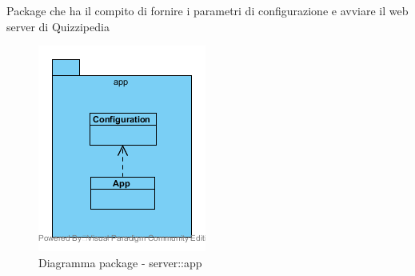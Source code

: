 Package che ha il compito di fornire i parametri di configurazione e avviare il web server di Quizzipedia\begin{center}
	\begin{figure}[H]
		\centering \includegraphics[scale=4, max width=\textwidth, max height=\myheight]{../img/diagrammiClassi/server/app.png}
		\caption{Diagramma package - server::app}
	\end{figure}
\end{center}\hypertarget{server::app::App}{}
